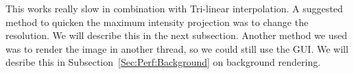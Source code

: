 This works really slow in combination with Tri-linear interpolation.
A suggested method to quicken the maximum intensity projection was to change the resolution. 
We will describe this in the next subsection. 
Another method we used was to render the image in another thread, so we could still use the GUI.
We will desribe this in Subsection~\ref{Sec:Perf:Background} on background rendering.
